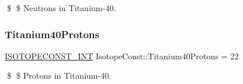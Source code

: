 \$ \$ Neutrons in Titanium-\/40. \mbox{\label{group___isotope_const-_titanium-_ti40_ga887fbc00ea33840ce0e6163a1125d3d9}} 
\subsubsection{\texorpdfstring{Titanium40\+Protons}{Titanium40Protons}}
{\footnotesize\ttfamily \mbox{\hyperlink{group___isotope_const-_macros_ga5f18360b3e99483a35c32d789e62621c}{I\+S\+O\+T\+O\+P\+E\+C\+O\+N\+S\+T\+\_\+\+I\+NT}} Isotope\+Const\+::\+Titanium40\+Protons = 22}

\$ \$ Protons in Titanium-\/40. 